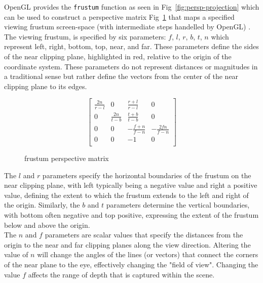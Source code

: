 OpenGL provides the \texttt{frustum} function as seen in Fig~\ref{fig:persp-projection} which can be used to construct a perspective matrix Fig~\ref{fig:perspective-matrix} that maps a specified viewing frustum  screen-space (with intermediate steps handelled by OpenGL) \cite{hearn2004computer}. The viewing frustum, is specified by six parameters: $f$, $l$, $r$, $b$, $t$, $n$ which represent left, right, bottom, top, near, and far. These parameters define the sides of the near clipping plane, highlighted in red, relative to the origin of the coordinate system. These parameters do not represent distances or magnitudes in a traditional sense but rather define the vectors from the center of the near clipping plane to its edges. \\

\begin{figure}[H]
    \[
        \begin{bmatrix}
            \frac{2n}{r-l} & 0              & \frac{r+l}{r-l}  & 0                \\
            0              & \frac{2n}{t-b} & \frac{t+b}{t-b}  & 0                \\
            0              & 0              & -\frac{f+n}{f-n} & -\frac{2fn}{f-n} \\
            0              & 0              & -1               & 0                \\
        \end{bmatrix}
    \]
    \caption{frustum perspective matrix}
    \label{fig:perspective-matrix}
\end{figure}

The $l$ and $r$ parameters specify the horizontal boundaries of the frustum on the near clipping plane, with left typically being a negative value and right a positive value, defining the extent to which the frustum extends to the left and right of the origin. Similarly, the $b$ and $t$ parameters determine the vertical boundaries, with bottom often negative and top positive, expressing the extent of the frustum below and above the origin. \\

The $n$ and $f$ parameters are scalar values that specify the distances from the origin to the near and far clipping planes along the view direction. Altering the value of $n$ will change the angles of the lines (or vectors) that connect the corners of the near plane to the eye, effectively changing the "field of view". Changing the value $f$ affects the range of depth that is captured within the scene. \\


